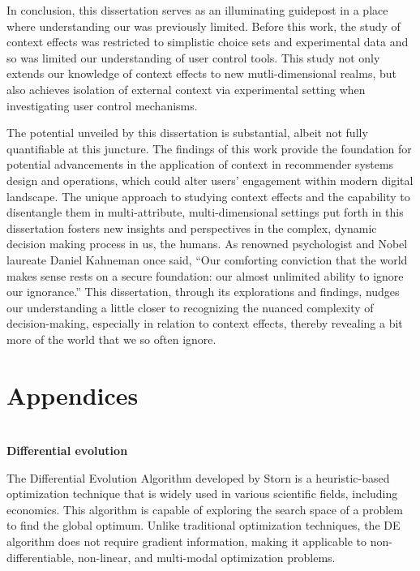 \documentclass[a4paper,12pt]{article}
\newcommand{\citeyearonly}[1]{\citeyearpar{#1}}
\begin{document}
In conclusion, this dissertation serves as an illuminating guidepost in a place where understanding our was previously limited. Before this work, the study of context effects was restricted to simplistic choice sets and experimental data and so was limited our understanding of user control tools.  This study not only extends our knowledge of context effects to new mutli-dimensional realms, but also achieves isolation of external context via experimental setting when investigating user control mechanisms.

The potential unveiled by this dissertation is substantial, albeit not fully quantifiable at this juncture. The findings of this work provide the foundation for potential advancements in the application of context in recommender systems design and operations, which could alter users' engagement within modern digital landscape. The unique approach to studying context effects and the capability to disentangle them in multi-attribute, multi-dimensional settings put forth in this dissertation fosters new insights and perspectives in the complex, dynamic decision making process in us, the humans. As renowned psychologist and Nobel laureate Daniel Kahneman once said, ``Our comforting conviction that the world makes sense rests on a secure foundation: our almost unlimited ability to ignore our ignorance.'' This dissertation, through its explorations and findings, nudges our understanding a little closer to recognizing the nuanced complexity of decision-making, especially in relation to context effects, thereby revealing a bit more of the world that we so often ignore.

\newpage

%




\clearpage

\section{Appendices}
\appendix
\section{}\label{appendix:Differential evolution}
\textbf{Differential evolution}

The Differential Evolution Algorithm developed by Storn \citeyearonly{storn1997differential} is a heuristic-based optimization technique that is widely used in various scientific fields, including economics. This algorithm is capable of exploring the search space of a problem to find the global optimum. Unlike traditional optimization techniques, the DE algorithm does not require gradient information, making it applicable to non-differentiable, non-linear, and multi-modal optimization problems.
\end{document}
